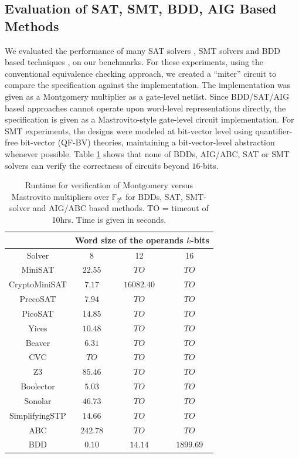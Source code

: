 \subsection{Evaluation of SAT, SMT, BDD, AIG Based Methods}

We evaluated the performance of many SAT solvers \cite{cryptominisat}
\cite{precosat} \cite{minisat} \cite{picosat}, SMT solvers
\cite{yices} \cite{cvc3} \cite{z3} \cite{mathsat4} \cite{boolector}
\cite{sonolar} \cite{SSTP} \cite{abc} and BDD based techniques
\cite{cudd}, on our benchmarks. For these experiments, using the
conventional equivalence checking approach, we created a 
``miter'' circuit to compare the specification against the
implementation. The implementation was given as a Montgomery
multiplier as a gate-level netlist. Since BDD/SAT/AIG based approaches
cannot operate upon word-level representations directly, the
specification is given as a Mastrovito-style gate-level circuit
implementation.  For SMT experiments, the designs were modeled at
bit-vector level using quantifier-free bit-vector (QF-BV) theories,
maintaining a bit-vector-level abstraction whenever possible. Table
\ref{tab:result} shows that none of BDDs, AIG/ABC, SAT or SMT solvers
can verify the correctness of circuits beyond $16$-bits.    


\begin{table}[hbt!]
\begin{center}
\caption{ Runtime for verification of Montgomery versus
  Mastrovito multipliers over $\mathbb{F}_{2^k}$ for BDDs, SAT,
  SMT-solver and AIG/ABC based methods. TO = timeout of 10hrs. Time is
  given in seconds.}   
\label{tab:result}
\begin{tabular}{|c||c|c|c|} \hline 
 & \multicolumn{3}{|c|}{Word size of the operands $k$-bits}\\ 
\hline
Solver & 8 & 12 & 16  \\
\hline \hline
MiniSAT& $22.55$& $TO$&$TO$  \\
\hline
CryptoMiniSAT &$7.17$&$16082.40$&$TO$  \\
\hline
PrecoSAT &$7.94$ &$TO$ &$TO$  \\
\hline
PicoSAT &$14.85$ &$TO$ &$TO$  \\
\hline \hline
Yices  &$10.48$ &$TO$ &$TO$ \\
\hline
Beaver &$6.31$ &$TO$ &$TO$  \\
\hline
CVC &$TO$ &$TO$ &$TO$  \\
\hline
Z3  &$85.46$ &$TO$ &$TO$ \\
\hline
Boolector &$5.03$&$TO$ &$TO$ \\
\hline 
Sonolar &$46.73$& $TO$ &$TO$  \\
\hline
SimplifyingSTP &$14.66$&$TO$ &$TO$  \\
\hline 
ABC &$242.78$&$TO$ &$TO$  \\
\hline \hline
BDD &$0.10$ &$14.14$ &$1899.69$  \\
\hline
\end{tabular}
\end{center}
\end{table}

